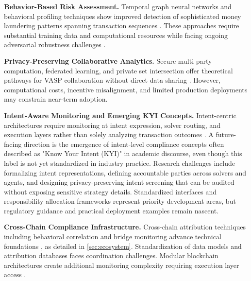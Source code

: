 \documentclass[conference,compsoc]{IEEEtran}
\begin{document}
\noindent\textbf{Behavior-Based Risk Assessment.}
Temporal graph neural networks and behavioral profiling techniques show improved detection of sophisticated money laundering patterns spanning transaction sequences \cite{albrecht2019usecryptocurrenciesmoney,cheng2023evolvepathtracer,cheng2024earlydetectionmalicious,arnold2024insightscaveatsmining,ouyang2024bitcoinmoneylaundering,li2025globallocalgraphattention,lin2024denseflowspottingcryptocurrency}. These approaches require substantial training data and computational resources while facing ongoing adversarial robustness challenges \cite{rodriguezvalencia2025systematicreviewartificial}.

\noindent\textbf{Privacy-Preserving Collaborative Analytics.}
Secure multi-party computation, federated learning, and private set intersection offer theoretical pathways for VASP collaboration without direct data sharing \cite{bansod2022challengesmakingblockchain}. However, computational costs, incentive misalignment, and limited production deployments may constrain near-term adoption.

\noindent\textbf{Intent-Aware Monitoring and Emerging KYI Concepts.}
Intent-centric architectures require monitoring at intent expression, solver routing, and execution layers rather than solely analyzing transaction outcomes \cite{mao2025knowyourintent}. A future-facing direction is the emergence of intent-level compliance concepts often described as "Know Your Intent (KYI)" in academic discourse, even though this label is not yet standardized in industry practice. Research challenges include formalizing intent representations, defining accountable parties across solvers and agents, and designing privacy-preserving intent screening that can be audited without exposing sensitive strategy details. Standardized interfaces and responsibility allocation frameworks represent priority development areas, but regulatory guidance and practical deployment examples remain nascent.

\noindent\textbf{Cross-Chain Compliance Infrastructure.}
Cross-chain attribution techniques including behavioral correlation and bridge monitoring advance technical foundations \cite{yousaf2019tracingtransactionscryptocurrency,zamyatin2021sokcommunicationdistributed,zhang2024securitycrosschainbridges,li2025blockchaincrosschainbridge,lin2024crosschainabnormaltransaction}, as detailed in \autoref{sec:ecosystem}. Standardization of data models and attribution databases faces coordination challenges. Modular blockchain architectures create additional monitoring complexity requiring execution layer access \cite{xu2024exploringblockchaintechnology,chaliasos2024analyzingbenchmarkingzkrollups}.
\end{document}
